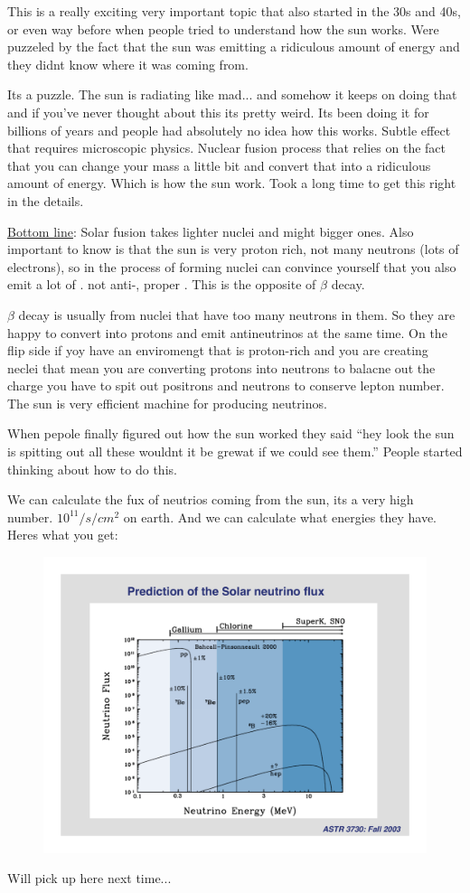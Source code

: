 {This is a really exciting very important topic that also started in the 30s and 40s, or even way before when people tried to understand how the sun works.
Were puzzeled by the fact that the sun was emitting a ridiculous amount of energy and they didnt know where it was coming from. 

Its a puzzle. 
The sun is radiating like mad... and somehow it keeps on doing that and if you've never thought about this its pretty weird. 
Its been doing it for billions of years and people had absolutely no idea how this works.  
Subtle effect that requires microscopic physics.  
Nuclear fusion process that relies on the fact that you can change your mass a little bit and convert that into a ridiculous amount of energy.
Which is how the sun work. 
Took a long time to get this right in the details. 


\underline{Bottom line}: Solar fusion takes lighter nuclei and might bigger ones.
Also important to know is that the sun is very proton rich, not many neutrons (lots of electrons), so in the process of forming nuclei can convince yourself that you also emit a lot of \nus. 
not anti-\nus, proper \nus.   
This is the opposite of $\beta$ decay. 

$\beta$ decay is usually from nuclei that have too many neutrons in them. 
So they are happy to convert into protons and emit antineutrinos at the same time. 
On the flip side if yoy have an enviromengt that is proton-rich and you are creating neclei that mean you are converting protons into neutrons to balacne out the charge you have to spit out positrons and neutrons to conserve lepton number. 
The sun is very efficient machine for producing neutrinos. 

When pepole finally figured out how the sun worked they said ``hey look the sun is spitting out all these \nus wouldnt it be grewat if we could see them.''
People started thinking about how to do this. 

We can calculate the fux of neutrios coming from the sun,  its a very high number. $10^{11}/s/cm^2$ on earth. 
And we can calculate what energies they have.  
Heres what you get:

\begin{figure}[h!]
\centering
\includegraphics[width=1.0\textwidth]{./NuFromSun.pdf}
\end{figure}

Will pick up here next time...



}



